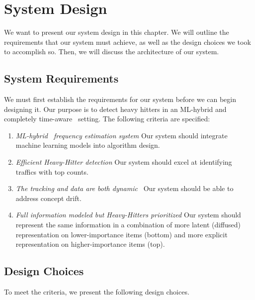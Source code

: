 \chapter{System Design}
\label{chapter:system_design}

We want to present our system design in this chapter. We will outline the requirements that our system must achieve, as well as the design choices we took to accomplish so. 
Then, we will discuss the architecture of our system. 

\section{System Requirements}
We must first establish the requirements for our system before we can begin designing it. Our purpose is to detect heavy hitters in an ML-hybrid and completely time-aware~\cite{campos2014time} setting.
The following criteria are specified: 

\begin{enumerate}
    \item \emph{ML-hybrid~\cite{mohan2019effective} frequency estimation system} Our system should integrate machine learning models into algorithm design. 
    
    \item \emph{Efficient Heavy-Hitter detection} Our system should excel at identifying traffics with top counts.
    
    \item \emph{The tracking and data are both dynamic~\cite{widanagamaachchi2012interactive}} Our system should be able to address concept drift.
    
    \item \emph{Full information modeled but Heavy-Hitters prioritized} Our system should represent the same information in a combination of more latent (diffused) representation on lower-importance items (bottom) and more explicit representation on higher-importance items (top).

\end{enumerate}

\section{Design Choices}
To meet the criteria, we present the following design choices. 

